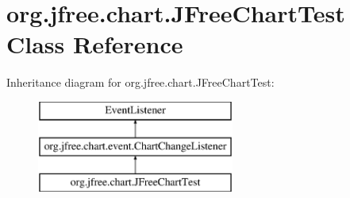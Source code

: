 \hypertarget{classorg_1_1jfree_1_1chart_1_1_j_free_chart_test}{}\section{org.\+jfree.\+chart.\+J\+Free\+Chart\+Test Class Reference}
\label{classorg_1_1jfree_1_1chart_1_1_j_free_chart_test}
Inheritance diagram for org.\+jfree.\+chart.\+J\+Free\+Chart\+Test\+:\begin{figure}[H]
\begin{center}
\leavevmode
\includegraphics[height=3.000000cm]{classorg_1_1jfree_1_1chart_1_1_j_free_chart_test}
\end{center}
\end{figure}
